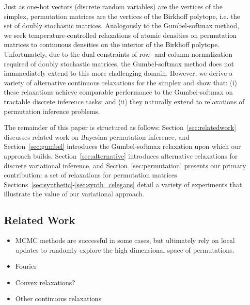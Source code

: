 \documentclass{article}
\begin{document}
Just as one-hot vectors (discrete random variables) are the vertices
of the simplex, permutation matrices are the vertices of the Birkhoff
polytope, i.e. the set of doubly stochastic matrices.  Analogously to
the Gumbel-softmax method, we seek temperature-controlled relaxations
of atomic densities on permutation matrices to continuous densities on
the interior of the Birkhoff polytope.  Unfortunately, due to the
dual constraints of row- and column-normalization required of doubly
stochastic matrices, the Gumbel-softmax method does not immmediately
extend to this more challenging domain.  However, we derive a variety
of alternative continuous relaxations for the simplex and show that:
(i) these relaxations achieve comparable performance to the Gumbel-softmax
  on tractable discrete inference tasks; and
(ii) they naturally extend to relaxations of permutation inference
  problems. 

The remainder of this paper is structured as follows: Section~\ref{sec:relatedwork}
discusses related work on Bayesian permutation inference, and Section~\ref{sec:gumbel}
introduces the Gumbel-softmax relaxation upon which our approach builds.
Section~\ref{sec:alternative} introduces alternative relaxations for
discrete variational inference, and Section~\ref{sec:permutation} presents
our primary contribution: a set of relaxations for permutation matrices
Sections~\ref{sec:synthetic}-\ref{sec:synth_celegans} detail a variety
of experiments that illustrate the value of our variational approach.
  
\subsection{Related Work}
\label{sub:relatedwork}

\begin{itemize}
  \item MCMC \citep{diaconis1988group} methods are successful
in some cases, but ultimately rely on local updates to randomly
explore the high dimensional space of permutations.

  \item Fourier \citep{kondor2007multi, huang2009fourier}

  \item Convex relaxations? \citep{lim2014beyond}

  \item Other continuous relaxations \citep{plis2011directional}
\end{itemize}
\end{document}

